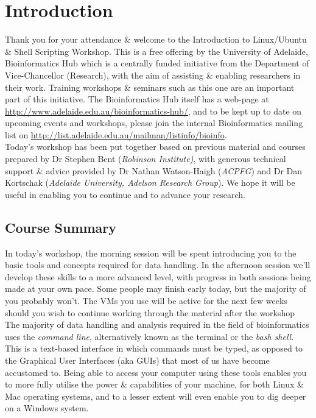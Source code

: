 \documentclass[a4paper,12pt,twoside]{memoir}
\begin{document}
%
%
\workshoptitlepage

\chapter{Introduction}

Thank you for your attendance \& welcome to the Introduction to Linux/Ubuntu \& Shell Scripting Workshop.
This is a free offering by the University of Adelaide, Bioinformatics Hub which is a centrally funded initiative from the Department of Vice-Chancellor (Research), with the aim of assisting \& enabling researchers in their work.
Training workshops \& seminars such as this one  are an important part of this initiative. 
The Bioinformatics Hub itself has a web-page at \url{http://www.adelaide.edu.au/bioinformatics-hub/}, and to be kept up to date on upcoming events and workshops, please join the internal Bioinformatics mailing list on \url{http://list.adelaide.edu.au/mailman/listinfo/bioinfo}.\\

Today's workshop has been put together based on previous material and courses prepared by Dr Stephen Bent (\textit{Robinson Institute)}, with generous technical support \& advice provided by Dr Nathan Watson-Haigh (\textit{ACPFG}) and Dr Dan Kortschak (\textit{Adelaide University, Adelson Research Group}). 
We hope it will be useful in enabling you to continue and to advance your research.\\

\section{Course Summary}
In today's workshop, the morning session will be spent introducing you to the basic tools and concepts required for data handling.
In the afternoon session we'll develop these skills to a more advanced level, with progress in both sessions being made at your own pace.
Some people may finish early today, but the majority of you probably won't.
The VMs you use will be active for the next few weeks should you wish to continue working through the material after the workshop \\

The majority of data handling and analysis required in the field of bioinformatics uses the \textit{command line}, alternatively known as the terminal or the \textit{bash shell}.
This is a text-based interface in which commands must be typed, as opposed to the Graphical User Interfaces (aka GUIs) that most of us have become accustomed to.
Being able to access your computer using these tools enables you to more fully utilise the power \& capabilities of your machine, for both Linux \& Mac operating systems, and to a lesser extent will even enable you to dig deeper on a Windows system.\\
\end{document}
